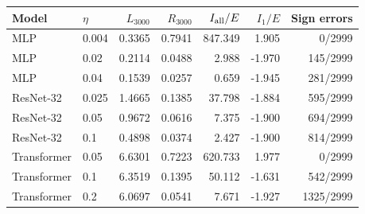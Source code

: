 \begin{tabular}{llrrrrr}
\toprule
Model & $\eta$ & $L_{3000}$ & $R_{3000}$ & $I_{\rm all}/E$ & $I_1/E$ & Sign errors \\
\midrule
MLP & 0.004 & 0.3365 & 0.7941 & 847.349 & 1.905 & 0/2999 \\
MLP & 0.02 & 0.2114 & 0.0488 & 2.988 & -1.970 & 145/2999 \\
MLP & 0.04 & 0.1539 & 0.0257 & 0.659 & -1.945 & 281/2999 \\
ResNet-32 & 0.025 & 1.4665 & 0.1385 & 37.798 & -1.884 & 595/2999 \\
ResNet-32 & 0.05 & 0.9672 & 0.0616 & 7.375 & -1.900 & 694/2999 \\
ResNet-32 & 0.1 & 0.4898 & 0.0374 & 2.427 & -1.900 & 814/2999 \\
Transformer & 0.05 & 6.6301 & 0.7223 & 620.733 & 1.977 & 0/2999 \\
Transformer & 0.1 & 6.3519 & 0.1395 & 50.112 & -1.631 & 542/2999 \\
Transformer & 0.2 & 6.0697 & 0.0541 & 7.671 & -1.927 & 1325/2999 \\
\bottomrule
\end{tabular}
